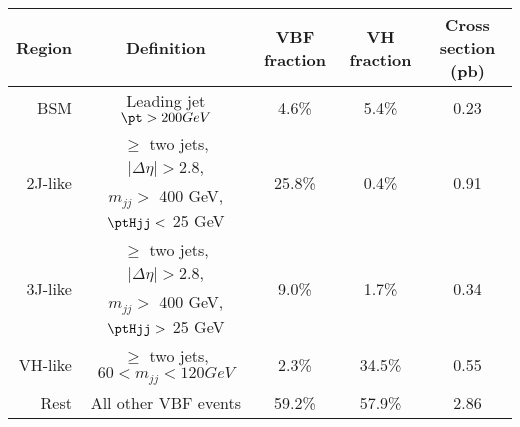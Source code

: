 \begin{tabular}{ r | c | c | c | c } 
\hline
Region & Definition & VBF fraction & VH fraction & Cross section (pb) \\ 
\hline
BSM                      & Leading jet $\pt > 200 GeV$             &  4.6\%                  & 5.4\%                   & 0.23                  \\ 
\hline
\multirow{2}{*}{2J-like} & $\ge$ two jets, $|\Delta\eta| > 2.8$,     & \multirow{2}{*}{25.8\%} & \multirow{2}{*}{0.4\%}  & \multirow{2}{*}{0.91} \\
                         & $m_{jj} >$ 400 GeV, $\ptHjj <$ 25 GeV    &                         &                         &                       \\
\hline
\multirow{2}{*}{3J-like} & $\ge$ two jets, $|\Delta\eta| > 2.8$,     & \multirow{2}{*}{9.0\%} & \multirow{2}{*}{1.7\%}  & \multirow{2}{*}{0.34} \\ 
                         & $m_{jj} >$ 400 GeV, $\ptHjj >$ 25 GeV    &                         &                         &                       \\
\hline
VH-like                  & $\ge$ two jets, $60 < m_{jj} < 120 GeV$ &  2.3\%                  & 34.5\%                  & 0.55 \\
\hline
Rest                     & All other VBF events                     & 59.2\%                  & 57.9\%                  & 2.86 \\ 
\hline
\end{tabular}
